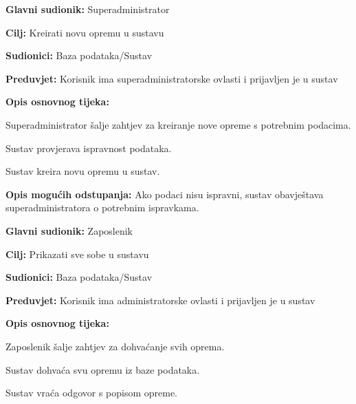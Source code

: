                 \noindent {}
					\begin{packed_item}
	
						\item \textbf{Glavni sudionik: }Superadministrator
						\item  \textbf{Cilj:} Kreirati novu opremu u sustavu
						\item  \textbf{Sudionici:} Baza podataka/Sustav
						\item  \textbf{Preduvjet:} Korisnik ima superadministratorske ovlasti i prijavljen je u sustav
						\item  \textbf{Opis osnovnog tijeka:}
						
						\item[] \begin{packed_enum}
	
							\item Superadministrator šalje zahtjev za kreiranje nove opreme s potrebnim podacima.
							\item Sustav provjerava ispravnost podataka.
                            \item Sustav kreira novu opremu u sustav.
	
						\end{packed_enum}
						
						\item  \textbf{Opis mogućih odstupanja:} Ako podaci nisu ispravni, sustav obavještava superadministratora o potrebnim ispravkama.
						
						
					\end{packed_item}

                \noindent {}
					\begin{packed_item}
	
						\item \textbf{Glavni sudionik: }Zaposlenik
						\item  \textbf{Cilj:} Prikazati sve sobe u sustavu
						\item  \textbf{Sudionici:} Baza podataka/Sustav
						\item  \textbf{Preduvjet:} Korisnik ima administratorske ovlasti i prijavljen je u sustav
						\item  \textbf{Opis osnovnog tijeka:}
						
						\item[] \begin{packed_enum}
	
							\item Zaposlenik šalje zahtjev za dohvaćanje svih oprema.
							\item Sustav dohvaća svu opremu iz baze podataka.
                            \item Sustav vraća odgovor s popisom opreme.
	
						\end{packed_enum}
						
					\end{packed_item}

